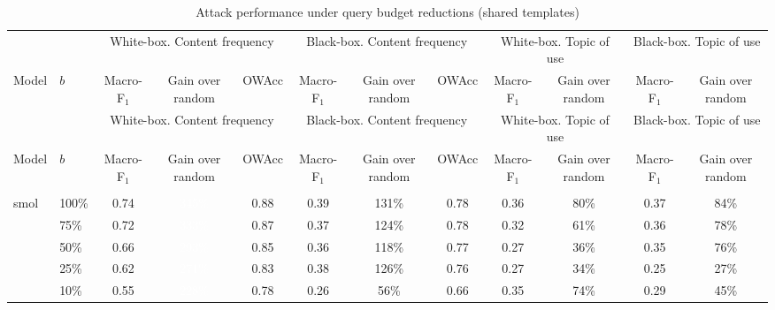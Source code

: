 \begingroup\footnotesize
\setlength{\tabcolsep}{3pt}
\begin{longtable}{llcccccccccc}
\caption{Attack performance under query budget reductions (shared templates)}\\
\toprule
 & & \multicolumn{3}{c}{White-box. Content frequency} & \multicolumn{3}{c}{Black-box. Content frequency} & \multicolumn{2}{c}{White-box. Topic of use} & \multicolumn{2}{c}{Black-box. Topic of use} \\
Model & $b$ & Macro-F$_1$ & Gain over random & OWAcc & Macro-F$_1$ & Gain over random & OWAcc & Macro-F$_1$ & Gain over random & Macro-F$_1$ & Gain over random \\
\midrule
\endfirsthead
\toprule
 & & \multicolumn{3}{c}{White-box. Content frequency} & \multicolumn{3}{c}{Black-box. Content frequency} & \multicolumn{2}{c}{White-box. Topic of use} & \multicolumn{2}{c}{Black-box. Topic of use} \\
Model & $b$ & Macro-F$_1$ & Gain over random & OWAcc & Macro-F$_1$ & Gain over random & OWAcc & Macro-F$_1$ & Gain over random & Macro-F$_1$ & Gain over random \\
\midrule
\endhead
\bottomrule
\endlastfoot
\midrule
\multicolumn{12}{l}{\textbf{Shared templates -- No cache -- PG19}} \\
\multirow{6}{*}{smol} & 100\% & 0.74 & \cellcolor{tablegreen!99}\textcolor{white}{345\%} & 0.88 & 0.39 & \cellcolor{tablegreen!37}131\% & 0.78 & 0.36 & \cellcolor{tablegreen!23}80\% & 0.37 & \cellcolor{tablegreen!24}84\% \\
 & 75\% & 0.72 & \cellcolor{tablegreen!95}\textcolor{white}{333\%} & 0.87 & 0.37 & \cellcolor{tablegreen!35}124\% & 0.78 & 0.32 & \cellcolor{tablegreen!17}61\% & 0.36 & \cellcolor{tablegreen!22}78\% \\
 & 50\% & 0.66 & \cellcolor{tablegreen!84}\textcolor{white}{293\%} & 0.85 & 0.36 & \cellcolor{tablegreen!34}118\% & 0.77 & 0.27 & \cellcolor{tablegreen!10}36\% & 0.35 & \cellcolor{tablegreen!22}76\% \\
 & 25\% & 0.62 & \cellcolor{tablegreen!77}\textcolor{white}{271\%} & 0.83 & 0.38 & \cellcolor{tablegreen!36}126\% & 0.76 & 0.27 & \cellcolor{tablegreen!10}34\% & 0.25 & \cellcolor{tablegreen!8}27\% \\
 & 10\% & 0.55 & \cellcolor{tablegreen!65}\textcolor{white}{228\%} & 0.78 & 0.26 & \cellcolor{tablegreen!16}56\% & 0.66 & 0.35 & \cellcolor{tablegreen!21}74\% & 0.29 & \cellcolor{tablegreen!13}45\% \\

\end{longtable}
